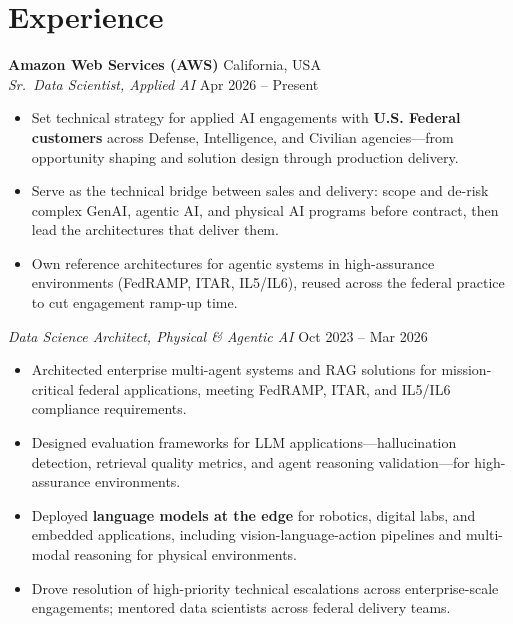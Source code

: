 \documentclass[11pt]{article}
\begin{document}
\section*{Experience}

\textbf{Amazon Web Services (AWS)} \hfill California, USA\\
\textit{Sr.\ Data Scientist, Applied AI} \hfill Apr 2026 -- Present
\begin{itemize}
    \item Set technical strategy for applied AI engagements with \textbf{U.S. Federal customers} across Defense, Intelligence, and Civilian agencies---from opportunity shaping and solution design through production delivery.
    \item Serve as the technical bridge between sales and delivery: scope and de-risk complex GenAI, agentic AI, and physical AI programs before contract, then lead the architectures that deliver them.
    \item Own reference architectures for agentic systems in high-assurance environments (FedRAMP, ITAR, IL5/IL6), reused across the federal practice to cut engagement ramp-up time.
\end{itemize}

\textit{Data Science Architect, Physical \& Agentic AI} \hfill Oct 2023 -- Mar 2026
\begin{itemize}
    \item Architected enterprise multi-agent systems and RAG solutions for mission-critical federal applications, meeting FedRAMP, ITAR, and IL5/IL6 compliance requirements.
    \item Designed evaluation frameworks for LLM applications---hallucination detection, retrieval quality metrics, and agent reasoning validation---for high-assurance environments.
    \item Deployed \textbf{language models at the edge} for robotics, digital labs, and embedded applications, including vision-language-action pipelines and multi-modal reasoning for physical environments.
    \item Drove resolution of high-priority technical escalations across enterprise-scale engagements; mentored data scientists across federal delivery teams.
\end{itemize}
\end{document}
